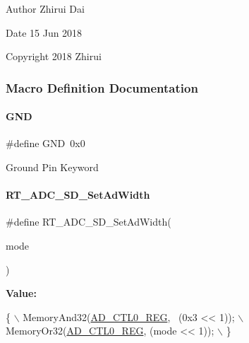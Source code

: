 \begin{DoxyAuthor}{Author}
Zhirui Dai 
\end{DoxyAuthor}
\begin{DoxyDate}{Date}
15 Jun 2018 
\end{DoxyDate}
\begin{DoxyCopyright}{Copyright}
2018 Zhirui 
\end{DoxyCopyright}


\subsubsection{Macro Definition Documentation}
\mbox{\label{a00002_a2c058e9d24bb65c1a6ad2d439b2976ab}} 
\paragraph{\texorpdfstring{G\+ND}{GND}}
{\footnotesize\ttfamily \#define G\+ND~0x0}

Ground Pin Keyword \mbox{\label{a00002_acb989d89893ac99af984979cb9e8df2a}} 
\paragraph{\texorpdfstring{R\+T\+\_\+\+A\+D\+C\+\_\+\+S\+D\+\_\+\+Set\+Ad\+Width}{RT\_ADC\_SD\_SetAdWidth}}
{\footnotesize\ttfamily \#define R\+T\+\_\+\+A\+D\+C\+\_\+\+S\+D\+\_\+\+Set\+Ad\+Width(\begin{DoxyParamCaption}\item[{}]{mode }\end{DoxyParamCaption})}

{\bfseries Value\+:}
\begin{DoxyCode}
\{                                          \(\backslash\)
        MemoryAnd32(\mbox{\hyperlink{a00020_adadaa0ab1ebbd7ba9b70dfd24c3ed44da479497b755dee411ad6348cae2ef26b4}{AD\_CTL0\_REG}}, ~(0x3 << 1)); \(\backslash\)
        MemoryOr32(\mbox{\hyperlink{a00020_adadaa0ab1ebbd7ba9b70dfd24c3ed44da479497b755dee411ad6348cae2ef26b4}{AD\_CTL0\_REG}}, (mode << 1));  \(\backslash\)
    \}
\end{DoxyCode}


